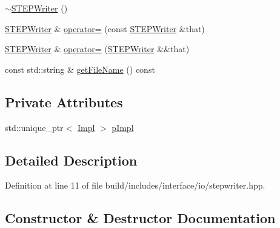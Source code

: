 \begin{DoxyCompactItemize}
\hyperlink{classMcCAD_1_1IO_1_1STEPWriter_a50066bad641148a65641ddb4ac21c07d}{$\sim$\+S\+T\+E\+P\+Writer} ()
\item 
\hyperlink{classMcCAD_1_1IO_1_1STEPWriter}{S\+T\+E\+P\+Writer} \& \hyperlink{classMcCAD_1_1IO_1_1STEPWriter_a2a12284f8e777a7663cda0d0a63b812a}{operator=} (const \hyperlink{classMcCAD_1_1IO_1_1STEPWriter}{S\+T\+E\+P\+Writer} \&that)
\item 
\hyperlink{classMcCAD_1_1IO_1_1STEPWriter}{S\+T\+E\+P\+Writer} \& \hyperlink{classMcCAD_1_1IO_1_1STEPWriter_a777d708b50c4e9d344686643269d4fb8}{operator=} (\hyperlink{classMcCAD_1_1IO_1_1STEPWriter}{S\+T\+E\+P\+Writer} \&\&that)
\item 
const std\+::string \& \hyperlink{classMcCAD_1_1IO_1_1STEPWriter_ae2f6dfdcd56327cc9423df2fe22b8195}{get\+File\+Name} () const
\end{DoxyCompactItemize}
\subsection*{Private Attributes}
\begin{DoxyCompactItemize}
\item 
std\+::unique\+\_\+ptr$<$ \hyperlink{classMcCAD_1_1IO_1_1STEPWriter_1_1Impl}{Impl} $>$ \hyperlink{classMcCAD_1_1IO_1_1STEPWriter_af607286b2a18648c14ece6b8bc103db4}{p\+Impl}
\end{DoxyCompactItemize}


\subsection{Detailed Description}


Definition at line 11 of file build/includes/interface/io/stepwriter.\+hpp.



\subsection{Constructor \& Destructor Documentation}
\mbox{\label{classMcCAD_1_1IO_1_1STEPWriter_a3013407d8ffe55a75e1aa6797cd0d2ea}} 
